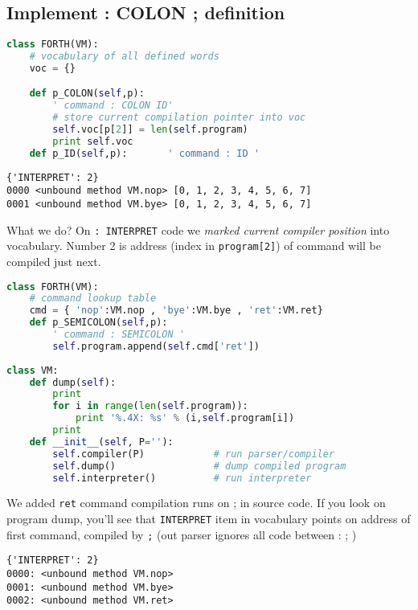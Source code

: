 \subsection{Implement : COLON ; definition}

\begin{lstlisting}[language=Python]
class FORTH(VM):
	# vocabulary of all defined words
	voc = {}

  	def p_COLON(self,p):
  		' command : COLON ID'
  		# store current compilation pointer into voc
  		self.voc[p[2]] = len(self.program)
  		print self.voc
  	def p_ID(self,p):		' command : ID '
\end{lstlisting}
\begin{lstlisting}
{'INTERPRET': 2}
0000 <unbound method VM.nop> [0, 1, 2, 3, 4, 5, 6, 7]
0001 <unbound method VM.bye> [0, 1, 2, 3, 4, 5, 6, 7]
\end{lstlisting}
What we do? On \verb|: INTERPRET| code we \emph{marked current compiler
position} into vocabulary. Number 2 is address (index in \verb|program[2]|) of
command will be compiled just next.
\begin{lstlisting}[language=Python]
class FORTH(VM):
	# command lookup table
	cmd = { 'nop':VM.nop , 'bye':VM.bye , 'ret':VM.ret}
 	def p_SEMICOLON(self,p):
 		' command : SEMICOLON '
 		self.program.append(self.cmd['ret'])
 		
class VM:
  	def dump(self):	
  		print
  		for i in range(len(self.program)):
  			print '%.4X: %s' % (i,self.program[i])
  		print
	def __init__(self, P=''):
		self.compiler(P)			# run parser/compiler
		self.dump()					# dump compiled program
		self.interpreter()		  	# run interpreter
\end{lstlisting}
We added \verb|ret| command compilation runs on ; in source code. If you look on
program dump, you'll see that \verb|INTERPRET| item in vocabulary points on
address of first command, compiled by \verb|;| (out parser ignores all code
between :
; )
\begin{lstlisting}
{'INTERPRET': 2}
0000: <unbound method VM.nop>
0001: <unbound method VM.bye>
0002: <unbound method VM.ret>
\end{lstlisting}

\clearpage
